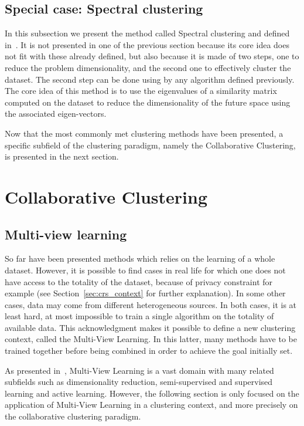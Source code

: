     \subsection{Special case: Spectral clustering}

    In this subsection we present the method called Spectral clustering and defined in~\cite{Ng01onspectral}. It is not presented in one of the previous section because its core idea does not fit with these already defined, but also because it is made of two steps, one to reduce the problem dimensionality, and the second one to effectively cluster the dataset. The second step can be done using by any algorithm defined previously. The core idea of this method is to use the eigenvalues of a similarity matrix computed on the dataset to reduce the dimensionality of the future space using the associated eigen-vectors.

    Now that the most commonly met clustering methods have been presented, a specific subfield of the clustering paradigm, namely the Collaborative Clustering, is presented in the next section.

    \section{Collaborative Clustering}
\label{sec:soa_cc}

    \subsection{Multi-view learning}

    So far have been presented methods which relies on the learning of a whole dataset. However, it is possible to find cases in real life for which one does not have access to the totality of the dataset, because of privacy constraint for example (see Section~\ref{sec:crs_context} for further explanation). In some other cases, data may come from different heterogeneous sources. In both cases, it is at least hard, at most impossible to train a single algorithm on the totality of available data. This acknowledgment makes it possible to define a new clustering context, called the Multi-View Learning. In this latter, many methods have to be trained together before being combined in order to achieve the goal initially set.
    
    As presented in~\cite{sun2013survey}, Multi-View Learning is a vast domain with many related subfields such as dimensionality reduction, semi-supervised and supervised learning and active learning. However, the following section is only focused on the application of Multi-View Learning in a clustering context, and more precisely on the collaborative clustering paradigm.
    
